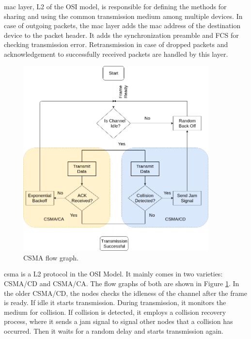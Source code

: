 \ac{mac} layer, \ac{L2} of the \ac{OSI} model, is responsible for defining the methods for sharing and using the common transmission medium among multiple devices.
In case of outgoing packets, the \ac{mac} layer adds the \ac{mac} address of the destination device to the packet header.
It adds the synchronization preamble and \ac{FCS} for checking transmission error.
Retransmission in case of dropped packets and acknowledgement to successfully received packets are handled by this layer.\\

\begin{figure}[h!]
\centering
\includegraphics[width=0.9\textwidth]{Figure/CSMA.png}
\caption{CSMA flow graph.}
\label{Csma_flow}
\end{figure}

\ac{csma} is a \ac{L2} protocol in the OSI Model. 
It mainly comes in two varieties: \ac{CSMA/CD}  and \ac{CSMA/CA}.
The flow graphs of both are shown in Figure \ref{Csma_flow}.
In the older \ac{CSMA/CD}, the nodes checks the idleness of the channel after the frame is ready.
If idle it starts transmission.
During transmission, it monitors the medium for collision.
If collision is detected, it employs a collision recovery process, where it sends a jam signal to signal other nodes that a collision has occurred.
Then it waits for a  random delay and starts transmission again.\\

